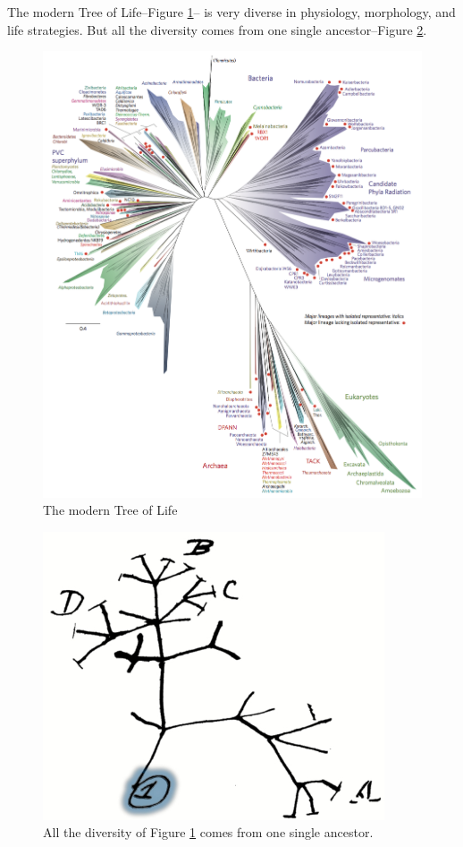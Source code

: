 \documentclass[]{article}
\begin{document}
The modern Tree of Life--Figure \ref{fig:TOL4}-- is very diverse in physiology, morphology, and life strategies. But all the diversity  comes from one single ancestor--Figure \ref{fig:TOL_root}.
\begin{figure}[H]
	\caption[The modern Tree of Life]{The modern Tree of Life\cite{hug2016new}}\label{fig:TOL4}
	\includegraphics[width=\textwidth]{A_Novel_Representation_Of_The_Tree_Of_Life}
\end{figure}

\begin{figure}[H]
	\caption{All the diversity of Figure \ref{fig:TOL4} comes from one single ancestor.}\label{fig:TOL_root}
	\includegraphics[width=0.9\textwidth]{TOL_root}
\end{figure}
\end{document}
